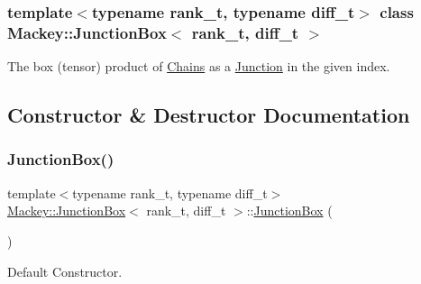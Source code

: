 \subsubsection*{template$<$typename rank\+\_\+t, typename diff\+\_\+t$>$\newline
class Mackey\+::\+Junction\+Box$<$ rank\+\_\+t, diff\+\_\+t $>$}

The box (tensor) product of \hyperlink{classMackey_1_1Chains}{Chains} as a \hyperlink{classMackey_1_1Junction}{Junction} in the given index. 

\subsection{Constructor \& Destructor Documentation}
\mbox{\label{classMackey_1_1JunctionBox_a6cc2a3bbcbf3e89d7079856b5d16cba4}} 
\subsubsection{\texorpdfstring{Junction\+Box()}{JunctionBox()}\hspace{0.1cm}{\footnotesize\ttfamily [1/3]}}
{\footnotesize\ttfamily template$<$typename rank\+\_\+t, typename diff\+\_\+t$>$ \\
\hyperlink{classMackey_1_1JunctionBox}{Mackey\+::\+Junction\+Box}$<$ rank\+\_\+t, diff\+\_\+t $>$\+::\hyperlink{classMackey_1_1JunctionBox}{Junction\+Box} (\begin{DoxyParamCaption}{ }\end{DoxyParamCaption})\hspace{0.3cm}{\ttfamily [inline]}}



Default Constructor. 

\mbox{\label{classMackey_1_1JunctionBox_ad1847b0ee8aaa343521366f2ff85b7bf}} 
